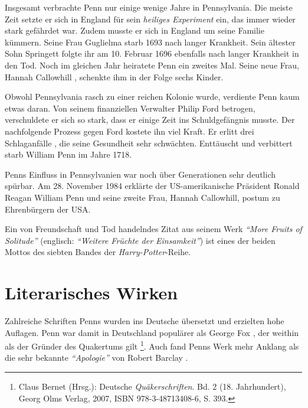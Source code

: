 \medskip

Insgesamt verbrachte Penn nur einige wenige Jahre in Pennsylvania. Die meiste
Zeit setzte er sich in England für sein \textit{heiliges Experiment} ein, das
immer wieder stark gefährdet war. Zudem musste er sich in England um seine
Familie kümmern. Seine Frau Guglielma starb 1693 nach langer Krankheit. Sein
ältester Sohn Springett folgte ihr am 10. Februar 1696 ebenfalls nach
langer Krankheit in den Tod. Noch im gleichen Jahr heiratete Penn ein zweites
Mal. Seine neue Frau, Hannah Callowhill ,
schenkte ihm in der Folge sechs Kinder.

\medskip

Obwohl Pennsylvania rasch zu einer reichen Kolonie wurde, verdiente Penn kaum
etwas daran. Von seinem finanziellen Verwalter Philip Ford
 betrogen, verschuldete er sich so stark, dass er
einige Zeit ins Schuldgefängnis  musste. Der nachfolgende
Prozess  gegen Ford kostete ihn viel Kraft. Er erlitt
drei Schlaganfälle , die seine Gesundheit sehr schwächten.
Enttäuscht und verbittert  starb William
Penn im Jahre 1718.

Penns Einfluss in Pennsylvanien war noch über Generationen sehr deutlich
spürbar. Am 28. November 1984 erklärte der US-amerikanische Präsident
Ronald Reagan  William Penn und seine zweite
Frau, Hannah Callowhill, postum zu Ehrenbürgern  der USA.

\medskip

Ein von Freundschaft und Tod
handelndes Zitat aus seinem Werk \textit{"`More Fruits of Solitude"'} (englisch:
\textit{"`Weitere Früchte der Einsamkeit"'}) ist eines der beiden Mottos des
siebten Bandes der \textit{Harry-Potter}-Reihe.

\medskip

\section{Literarisches Wirken}

Zahlreiche Schriften Penns wurden ins Deutsche  übersetzt
und erzielten hohe Auflagen. Penn war damit in Deutschland populärer als George
Fox , der weithin als der Gründer des Quakertums
gilt \footnote{Claus Bernet (Hrsg.): Deutsche \textit{Quäkerschriften}. Bd. 2
(18. Jahrhundert), Georg Olms Verlag, 2007, ISBN 978-3-48713408-6, S. 393.}.
Auch fand Penns Werk mehr Anklang als die sehr bekannte \textit{"`Apologie"'}
 von Robert Barclay .

